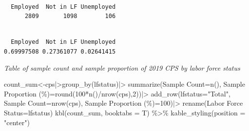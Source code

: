 \documentclass[
  letterpaper,
  DIV=11,
  numbers=noendperiod]{scrartcl}
\newenvironment{Shaded}{\begin{snugshade}}{\end{snugshade}}
\newcommand{\AttributeTok}[1]{\textcolor[rgb]{0.40,0.45,0.13}{#1}}
\newcommand{\DecValTok}[1]{\textcolor[rgb]{0.68,0.00,0.00}{#1}}
\newcommand{\FunctionTok}[1]{\textcolor[rgb]{0.28,0.35,0.67}{#1}}
\newcommand{\NormalTok}[1]{\textcolor[rgb]{0.00,0.23,0.31}{#1}}
\newcommand{\OtherTok}[1]{\textcolor[rgb]{0.00,0.23,0.31}{#1}}
\newcommand{\SpecialCharTok}[1]{\textcolor[rgb]{0.37,0.37,0.37}{#1}}
\newcommand{\StringTok}[1]{\textcolor[rgb]{0.13,0.47,0.30}{#1}}
\begin{document}
\begin{verbatim}

  Employed  Not in LF Unemployed 
      2809       1098        106 
\end{verbatim}

\begin{Shaded}
\end{Shaded}

\begin{verbatim}

  Employed  Not in LF Unemployed 
0.69997508 0.27361077 0.02641415 
\end{verbatim}

\emph{Table of sample count and sample proportion of 2019 CPS by labor
force status} 

\begin{Shaded}
\begin{Highlighting}[]
\NormalTok{count\_sum}\OtherTok{\textless{}{-}}\NormalTok{cps}\SpecialCharTok{|\textgreater{}}\FunctionTok{group\_by}\NormalTok{(lfstatus)}\SpecialCharTok{|\textgreater{}}
  \FunctionTok{summarize}\NormalTok{(}\StringTok{\textquotesingle{}Sample Count\textquotesingle{}}\OtherTok{=}\FunctionTok{n}\NormalTok{(),}
            \StringTok{\textquotesingle{}Sample Proportion (\%)\textquotesingle{}}\OtherTok{=}\FunctionTok{round}\NormalTok{(}\DecValTok{100}\SpecialCharTok{*}\FunctionTok{n}\NormalTok{()}\SpecialCharTok{/}\FunctionTok{nrow}\NormalTok{(cps),}\DecValTok{2}\NormalTok{))}\SpecialCharTok{|\textgreater{}}
  \FunctionTok{add\_row}\NormalTok{(}\AttributeTok{lfstatus=}\StringTok{"Total"}\NormalTok{, }\StringTok{\textquotesingle{}Sample Count\textquotesingle{}}\OtherTok{=}\FunctionTok{nrow}\NormalTok{(cps), }\StringTok{\textquotesingle{}Sample Proportion (\%)\textquotesingle{}}\OtherTok{=}\DecValTok{100}\NormalTok{)}\SpecialCharTok{|\textgreater{}}
  \FunctionTok{rename}\NormalTok{(}\StringTok{\textquotesingle{}Labor Force Status\textquotesingle{}}\OtherTok{=}\NormalTok{lfstatus)}
\FunctionTok{kbl}\NormalTok{(count\_sum, }\AttributeTok{booktabs =}\NormalTok{ T) }\SpecialCharTok{\%\textgreater{}\%}
  \FunctionTok{kable\_styling}\NormalTok{(}\AttributeTok{position =} \StringTok{"center"}\NormalTok{)}
\end{Highlighting}
\end{Shaded}
\end{document}
